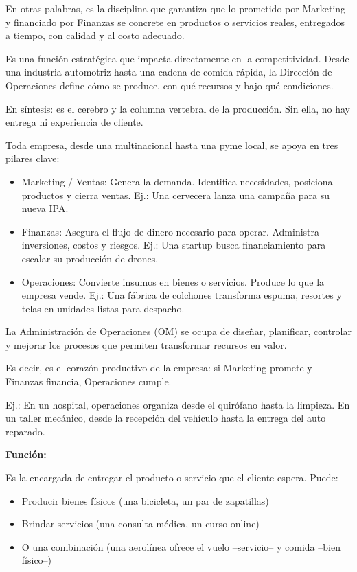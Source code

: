 \documentclass[a4paper,oneside,11pt]{article}
\begin{document}
En otras palabras, es la disciplina que garantiza que lo prometido por Marketing y financiado por Finanzas se concrete en productos o servicios reales, entregados a tiempo, con calidad y al costo adecuado.

Es una función estratégica que impacta directamente en la competitividad. Desde una industria automotriz hasta una cadena de comida rápida, la Dirección de Operaciones define cómo se produce, con qué recursos y bajo qué condiciones.

En síntesis: es el cerebro y la columna vertebral de la producción. Sin ella, no hay entrega ni experiencia de cliente.

Toda empresa, desde una multinacional hasta una pyme local, se apoya en tres pilares clave:

\begin{itemize}
    \item Marketing / Ventas: Genera la demanda. Identifica necesidades, posiciona productos y cierra ventas. Ej.: Una cervecera lanza una campaña para su nueva IPA.

    \item Finanzas: Asegura el flujo de dinero necesario para operar. Administra inversiones, costos y riesgos. Ej.: Una startup busca financiamiento para escalar su producción de drones.

    \item Operaciones: Convierte insumos en bienes o servicios. Produce lo que la empresa vende. Ej.: Una fábrica de colchones transforma espuma, resortes y telas en unidades listas para despacho.
\end{itemize}


La Administración de Operaciones (OM) se ocupa de diseñar, planificar, controlar y mejorar los procesos que permiten transformar recursos en valor.

Es decir, es el corazón productivo de la empresa: si Marketing promete y Finanzas financia, Operaciones cumple.

Ej.: En un hospital, operaciones organiza desde el quirófano hasta la limpieza. En un taller mecánico, desde la recepción del vehículo hasta la entrega del auto reparado.

\textbf{Función:}

Es la encargada de entregar el producto o servicio que el cliente espera. Puede:
\begin{itemize}
    \item Producir bienes físicos (una bicicleta, un par de zapatillas)
    \item Brindar servicios (una consulta médica, un curso online)
    \item O una combinación (una aerolínea ofrece el vuelo –servicio– y comida –bien físico–)
\end{itemize}
\end{document}
